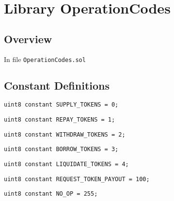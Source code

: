 
\chapter{Library OperationCodes}

\minitoc

\section{Overview}


In file {\tt OperationCodes.sol}

\section{Constant Definitions}


\begin{lstlisting}[firstnumber=4]
    uint8 constant SUPPLY_TOKENS = 0;
\end{lstlisting}

\begin{lstlisting}[firstnumber=5]
    uint8 constant REPAY_TOKENS = 1;
\end{lstlisting}

\begin{lstlisting}[firstnumber=6]
    uint8 constant WITHDRAW_TOKENS = 2;
\end{lstlisting}

\begin{lstlisting}[firstnumber=7]
    uint8 constant BORROW_TOKENS = 3;
\end{lstlisting}

\begin{lstlisting}[firstnumber=8]
    uint8 constant LIQUIDATE_TOKENS = 4;
\end{lstlisting}

\begin{lstlisting}[firstnumber=9]
    uint8 constant REQUEST_TOKEN_PAYOUT = 100;
\end{lstlisting}

\begin{lstlisting}[firstnumber=10]
    uint8 constant NO_OP = 255;
\end{lstlisting}
